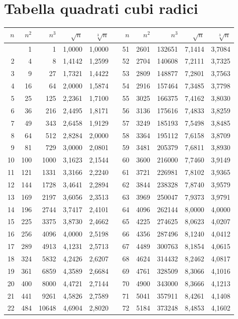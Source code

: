 \section{Tabella quadrati cubi radici}
\label{sec:Tabellaquadraticubiradici}
\begin{longtable}{rrrrrrrrrrr} 
	\toprule
	\bfseries $n$ &  $n^2$ & $n^3$&$\sqrt{n}$&$\sqrt[3]{n}$& &$n$ &  $n^2$ & $n^3$&$\sqrt{n}$&$\sqrt[3]{n}$  \\
	\midrule \endhead
	\bottomrule \endfoot
1&1&1&1,0000&1,0000&&51&2601&132651&7,1414&3,7084\\
2&4&8&1,4142&1,2599&&52&2704&140608&7,2111&3,7325\\
3&9&27&1,7321&1,4422&&53&2809&148877&7,2801&3,7563\\
4&16&64&2,0000&1,5874&&54&2916&157464&7,3485&3,7798\\
5&25&125&2,2361&1,7100&&55&3025&166375&7,4162&3,8030\\
6&36&216&2,4495&1,8171&&56&3136&175616&7,4833&3,8259\\
7&49&343&2,6458&1,9129&&57&3249&185193&7,5498&3,8485\\
8&64&512&2,8284&2,0000&&58&3364&195112&7,6158&3,8709\\
9&81&729&3,0000&2,0801&&59&3481&205379&7,6811&3,8930\\
10&100&1000&3,1623&2,1544&&60&3600&216000&7,7460&3,9149\\
11&121&1331&3,3166&2,2240&&61&3721&226981&7,8102&3,9365\\
12&144&1728&3,4641&2,2894&&62&3844&238328&7,8740&3,9579\\
13&169&2197&3,6056&2,3513&&63&3969&250047&7,9373&3,9791\\
14&196&2744&3,7417&2,4101&&64&4096&262144&8,0000&4,0000\\
15&225&3375&3,8730&2,4662&&65&4225&274625&8,0623&4,0207\\
16&256&4096&4,0000&2,5198&&66&4356&287496&8,1240&4,0412\\
17&289&4913&4,1231&2,5713&&67&4489&300763&8,1854&4,0615\\
18&324&5832&4,2426&2,6207&&68&4624&314432&8,2462&4,0817\\
19&361&6859&4,3589&2,6684&&69&4761&328509&8,3066&4,1016\\
20&400&8000&4,4721&2,7144&&70&4900&343000&8,3666&4,1213\\
21&441&9261&4,5826&2,7589&&71&5041&357911&8,4261&4,1408\\
22&484&10648&4,6904&2,8020&&72&5184&373248&8,4853&4,1602\\

\end{longtable}

